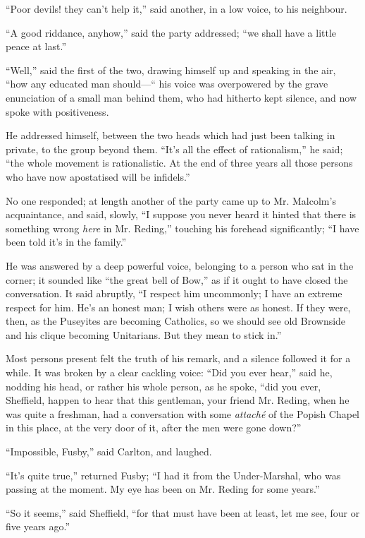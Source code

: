 ``Poor devils! they can't help it,'' said another, in a low
voice, to his neighbour.

``A good riddance, anyhow,'' said the party addressed;
``we shall have a little peace at last.''

``Well,'' said the first of the two, drawing himself up and
speaking in the air, ``how any educated man should—`` his
voice was overpowered by the grave enunciation of a small man behind
them, who had hitherto kept silence, and now spoke with positiveness.

He addressed himself, between the two heads which had just been
talking in private, to the group beyond them. ``It's all the
effect of rationalism,'' he said; ``the whole movement is
rationalistic. At the end of three years all those persons who have
now apostatised will be infidels.''

No one responded; at length another of the party came up to Mr.
Malcolm's acquaintance, and said, slowly, ``I suppose you never
heard it hinted that there is something wrong \emph{here} in Mr. Reding,''
touching his forehead significantly; ``I have been told it's in
the family.''

He was answered by a deep powerful voice, belonging to a
person who sat in the corner; it sounded like ``the great bell of
Bow,'' as if it ought to have closed the conversation. It said
abruptly, ``I respect him uncommonly; I have an extreme respect
for him. He's an honest man; I wish others were as honest. If they
were, then, as the Puseyites are becoming Catholics, so we should see
old Brownside and his clique becoming Unitarians. But they mean to
stick in.''

Most persons present felt the truth of his remark, and a silence
followed it for a while. It was broken by a clear cackling voice:
``Did you ever hear,'' said he, nodding his head, or rather
his whole person, as he spoke, ``did you ever, Sheffield, happen
to hear that this gentleman, your friend Mr. Reding, when he was quite
a freshman, had a conversation with some \emph{attaché} of the Popish
Chapel in this place, at the very door of it, after the men were gone
down?''

``Impossible, Fusby,'' said Carlton, and laughed.

``It's quite true,'' returned Fusby; ``I had it from
the Under-Marshal, who was passing at the moment. My eye has been on
Mr. Reding for some years.''

``So it seems,'' said Sheffield, ``for that must have
been at least, let me see, four or five years ago.''


